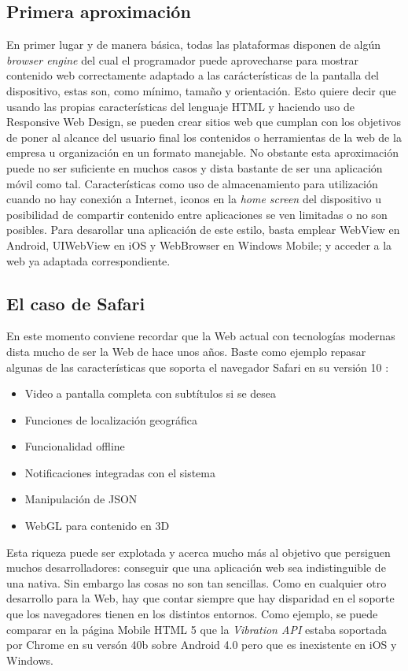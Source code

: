 \documentclass[
10pt, %
a4paper, %
oneside, %
headinclude,footinclude, %
BCOR5mm, %
]{scrartcl}
\begin{document}
\subsection{Primera aproximación}
En primer lugar y de manera básica, todas las plataformas disponen de algún \textit{browser engine} del cual el programador puede aprovecharse para mostrar contenido web correctamente adaptado a las carácterísticas de la pantalla del dispositivo, estas son, como mínimo, tamaño y orientación. Esto quiere decir que usando las propias características del lenguaje HTML y haciendo uso de Responsive Web Design, se pueden crear sitios web que cumplan con los objetivos de poner al alcance del usuario final los contenidos o herramientas de la web de la empresa u organización en un formato manejable. No obstante esta aproximación puede no ser suficiente en muchos casos y dista bastante de ser una aplicación móvil como tal. Características como uso de almacenamiento para utilización cuando no hay conexión a Internet, iconos en la \textit{home screen} del dispositivo u posibilidad de compartir contenido entre aplicaciones se ven limitadas o no son posibles. Para desarollar una aplicación de este estilo, basta emplear WebView en Android, UIWebView en iOS y WebBrowser en Windows Mobile; y acceder a la web ya adaptada correspondiente.

\subsection{El caso de Safari}
En este momento conviene recordar que la Web actual con tecnologías modernas dista mucho de ser la Web de hace unos años. Baste como ejemplo repasar algunas de las características que soporta el navegador Safari en su versión 10 \cite{apple_inc._features_2016}:
\begin{itemize}[noitemsep]
\item Video a pantalla completa con subtítulos si se desea
\item Funciones de localización geográfica
\item Funcionalidad offline
\item Notificaciones integradas con el sistema
\item Manipulación de JSON
\item WebGL para contenido en 3D
\end{itemize}

Esta riqueza puede ser explotada y acerca mucho más al objetivo que persiguen muchos desarrolladores: conseguir que una aplicación web sea indistinguible de una nativa. Sin embargo las cosas no son tan sencillas. Como en cualquier otro desarrollo para la Web, hay que contar siempre que hay disparidad en el soporte que los navegadores tienen en los distintos entornos. Como ejemplo, se puede comparar en la página Mobile HTML 5 \cite{maximiliano_firtman_html5_2015} que la \textit{Vibration API} estaba soportada por Chrome en su versón 40b sobre Android 4.0 pero que es inexistente en iOS y Windows.
\end{document}
